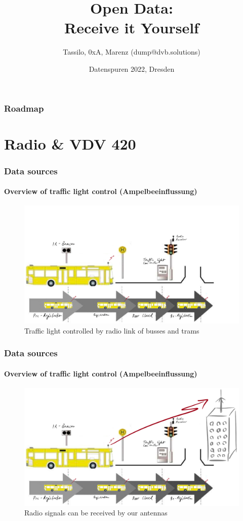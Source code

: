 \documentclass[aspectratio=169]{beamer}
\title{Open Data: \\ Receive it Yourself}
\date[ISPN ’80]{Datenspuren 2022, Dresden}
\author[]{Tassilo, 0xA, Marenz (dump@dvb.solutions)}
\begin{document}
\begin{frame}\titlepage
\end{frame}
  
\begin{frame} 
\frametitle{Roadmap} 

\tableofcontents

\end{frame}

\section{Radio \& VDV 420}


\begin{frame}
\frametitle{Data sources}
\framesubtitle{Overview of traffic light control (Ampelbeeinflussung)}
\begin{figure}
\centering
\includegraphics[height=0.65\textheight]{figs/lsa-beeinflussungs-stecke.pdf}
\caption{Traffic light controlled by radio link of busses and trams}
\end{figure}
\end{frame}


\begin{frame}
\frametitle{Data sources}
\framesubtitle{Overview of traffic light control (Ampelbeeinflussung)}
\begin{figure}
\centering
\includegraphics[height=0.65\textheight]{figs/lsa-beeinflussungs-stecke-mit-antenne.pdf}
\caption{Radio signals can be received by our antennas}
\end{figure}
\end{frame}
\end{document}
